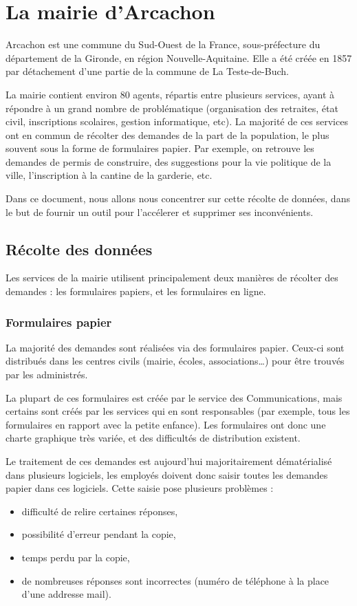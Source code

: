 \section{La mairie d'Arcachon}\label{sec:la-mairie-d'arcachon}

Arcachon est une commune du Sud-Ouest de la France, sous-préfecture du département de la Gironde, en région Nouvelle-Aquitaine.
Elle a été créée en 1857 par détachement d'une partie de la commune de La Teste-de-Buch.

La mairie contient environ 80 agents, répartis entre plusieurs services, ayant à répondre à un grand nombre de problématique (organisation des retraites, état civil, inscriptions scolaires, gestion informatique, etc).
La majorité de ces services ont en commun de récolter des demandes de la part de la population, le plus souvent sous la forme de formulaires papier.
Par exemple, on retrouve les demandes de permis de construire, des suggestions pour la vie politique de la ville, l'inscription à la cantine de la garderie, etc.

Dans ce document, nous allons nous concentrer sur cette récolte de données, dans le but de fournir un outil pour l'accélerer et supprimer ses inconvénients.

\subsection{Récolte des données}\label{subsec:recolte-des-donnees}

Les services de la mairie utilisent principalement deux manières de récolter des demandes : les formulaires papiers, et les formulaires en ligne.

\subsubsection{Formulaires papier}

La majorité des demandes sont réalisées via des formulaires papier.
Ceux-ci sont distribués dans les centres civils (mairie, écoles, associations…) pour être trouvés par les administrés.

La plupart de ces formulaires est créée par le service des Communications, mais certains sont créés par les services qui en sont responsables (par exemple, tous les formulaires en rapport avec la petite enfance).
Les formulaires ont donc une charte graphique très variée, et des difficultés de distribution existent.

Le traitement de ces demandes est aujourd'hui majoritairement dématérialisé dans plusieurs logiciels,
les employés doivent donc saisir toutes les demandes papier dans ces logiciels.
Cette saisie pose plusieurs problèmes :
\begin{itemize}
	\item difficulté de relire certaines réponses,
	\item possibilité d'erreur pendant la copie,
	\item temps perdu par la copie,
	\item de nombreuses réponses sont incorrectes (numéro de téléphone à la place d'une addresse mail).
\end{itemize}

